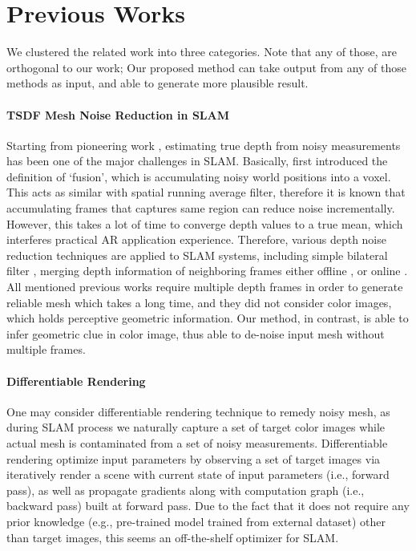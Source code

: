 \section{Previous Works}

We clustered the related work into three categories. Note that any of those, are orthogonal to our work; Our proposed method can take output from any of those methods as input, and able to generate more plausible result.

\paragraph{TSDF Mesh Noise Reduction in SLAM}
Starting from pioneering work \cite{curless1996volumetric}, 
estimating true depth from noisy measurements 
has been one of the major challenges in SLAM. 
Basically, \cite{curless1996volumetric} first introduced the definition of ‘fusion’, 
which is accumulating noisy world positions into a voxel. 
This acts as similar with spatial running average filter, 
therefore it is known that accumulating frames 
that captures same region can reduce noise incrementally. 
However, this takes a lot of time to converge depth values 
to a true mean, which interferes practical AR application experience. 
Therefore, various depth noise reduction techniques are applied to SLAM systems, 
including simple bilateral filter \cite{newcombe2011kinectfusion},  merging depth information of neighboring frames either offline \cite{choi2015robust}\cite{zhou2018open3d}, or online \cite{cao2018real}\cite{yang2020noise}. 
All mentioned previous works require multiple depth frames 
in order to generate reliable mesh which takes a long time, 
and they did not consider color images, which holds perceptive geometric information. 
Our method, in contrast, is able to infer geometric clue in color image, 
thus able to de-noise input mesh without multiple frames.

\paragraph{Differentiable Rendering}
One may consider differentiable rendering technique to remedy noisy mesh, as during SLAM process we naturally capture a set of target color images while actual mesh is contaminated from a set of noisy measurements.
Differentiable rendering optimize input parameters by observing a set of target images via iteratively render a scene with current state of input parameters (i.e., forward pass), 
as well as propagate gradients along with computation graph (i.e., backward pass) built at forward pass. 
Due to the fact that it does not require any prior knowledge (e.g., pre-trained model trained from external dataset) other than target images, this seems an off-the-shelf optimizer for SLAM. 

